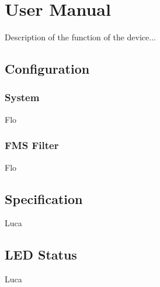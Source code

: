 \chapter{User Manual}

Description of the function of the device...

\section{Configuration}
\subsection{System}
Flo
\subsection{FMS Filter}
Flo

\section{Specification}
Luca

\section{LED Status}
Luca